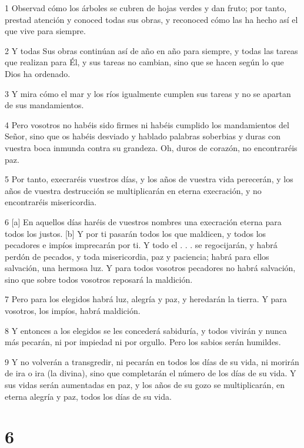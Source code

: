 \par 1 Observad cómo los árboles se cubren de hojas verdes y dan fruto; por tanto, prestad atención y conoced todas sus obras, y reconoced cómo las ha hecho así el que vive para siempre.
\par 2 Y todas Sus obras continúan así de año en año para siempre, y todas las tareas que realizan para Él, y sus tareas no cambian, sino que se hacen según lo que Dios ha ordenado.
\par 3 Y mira cómo el mar y los ríos igualmente cumplen sus tareas y no se apartan de sus mandamientos.
\par 4 Pero vosotros no habéis sido firmes ni habéis cumplido los mandamientos del Señor, sino que os habéis desviado y hablado palabras soberbias y duras con vuestra boca inmunda contra su grandeza. Oh, duros de corazón, no encontraréis paz.
\par 5 Por tanto, execraréis vuestros días, y los años de vuestra vida perecerán, y los años de vuestra destrucción se multiplicarán en eterna execración, y no encontraréis misericordia.
\par 6 [a] En aquellos días haréis de vuestros nombres una execración eterna para todos los justos. [b] Y por ti pasarán todos los que maldicen, y todos los pecadores e impíos imprecarán por ti. Y todo el . . . se regocijarán, y habrá perdón de pecados, y toda misericordia, paz y paciencia; habrá para ellos salvación, una hermosa luz. Y para todos vosotros pecadores no habrá salvación, sino que sobre todos vosotros reposará la maldición.
\par 7 Pero para los elegidos habrá luz, alegría y paz, y heredarán la tierra. Y para vosotros, los impíos, habrá maldición.
\par 8 Y entonces a los elegidos se les concederá sabiduría, y todos vivirán y nunca más pecarán, ni por impiedad ni por orgullo. Pero los sabios serán humildes.
\par 9 Y no volverán a transgredir, ni pecarán en todos los días de su vida, ni morirán de ira o ira (la divina), sino que completarán el número de los días de su vida. Y sus vidas serán aumentadas en paz, y los años de su gozo se multiplicarán, en eterna alegría y paz, todos los días de su vida.

\chapter{6}

